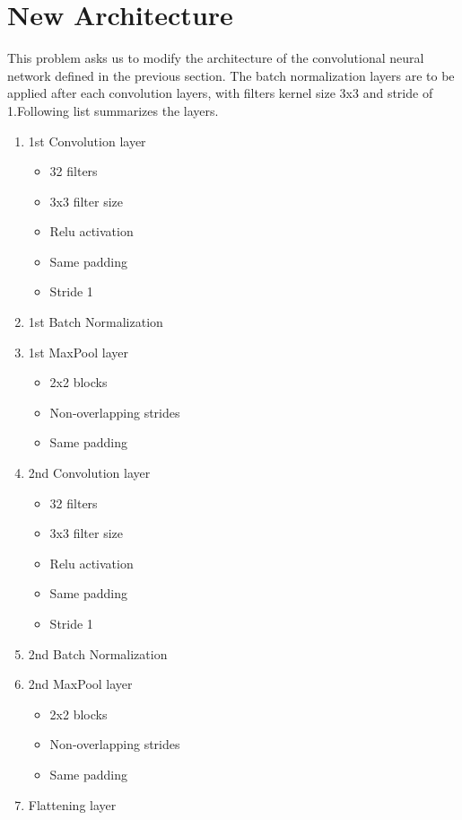 \documentclass[11pt]{article}
\begin{document}
\section{New Architecture}

This problem asks us to modify the architecture of the convolutional neural network defined in the previous section. The batch normalization layers are to be applied after each convolution layers, with filters kernel size 3x3 and stride of 1.Following list summarizes the layers.


\begin{enumerate}
    \item 1st Convolution layer
    \begin{itemize}
        \item 32 filters
        \item 3x3 filter size
        \item Relu activation
        \item Same padding
        \item Stride 1
    \end{itemize}
    \item 1st Batch Normalization
    \item 1st MaxPool layer
    \begin{itemize}
        \item 2x2 blocks
        \item Non-overlapping strides
        \item Same padding
    \end{itemize}
    \item 2nd Convolution layer
    \begin{itemize}
        \item 32 filters
        \item 3x3 filter size
        \item Relu activation
        \item Same padding
        \item Stride 1
    \end{itemize}
    \item 2nd Batch Normalization
    \item 2nd MaxPool layer
    \begin{itemize}
        \item 2x2 blocks
        \item Non-overlapping strides
        \item Same padding
    \end{itemize}
    \item Flattening layer

\end{enumerate}
\end{document}
